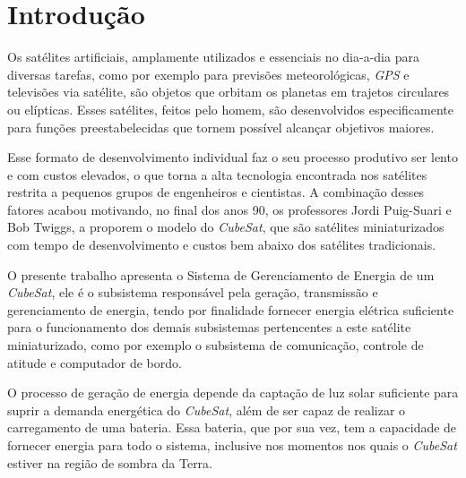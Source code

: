 \documentclass[
	12pt,				%
	openright,			%
	oneside,			%
	a4paper,			%
	english,			%
	french,				%
	spanish,			%
	brazil,				%
	oldfontcommands
	]{abntex2}
\begin{document}
\tableofcontents*
\cleardoublepage



\textual

\chapter[Introdução]{Introdução}

	Os satélites artificiais, amplamente utilizados e essenciais no dia-a-dia para diversas tarefas, como por exemplo para previsões meteorológicas, \textit{GPS} e televisões via satélite, são objetos que orbitam os planetas em trajetos circulares ou elípticas. Esses satélites, feitos pelo homem, são desenvolvidos especificamente para funções preestabelecidas que tornem possível alcançar objetivos maiores. 
	
	Esse formato de desenvolvimento individual faz o seu processo produtivo ser lento e com custos elevados, o que torna a alta tecnologia encontrada nos satélites restrita a pequenos grupos de engenheiros e cientistas. A combinação desses fatores acabou motivando, no final dos anos 90, os professores Jordi Puig-Suari e Bob Twiggs, a proporem o modelo do \textit{CubeSat}, que são satélites miniaturizados com tempo de desenvolvimento e custos bem abaixo dos satélites tradicionais.
	
	O presente trabalho apresenta o Sistema de Gerenciamento de Energia de um \textit{CubeSat}, ele é o subsistema responsável pela geração, transmissão e gerenciamento de energia, tendo por finalidade fornecer energia elétrica suficiente para o funcionamento dos demais subsistemas pertencentes a este satélite miniaturizado, como por exemplo o subsistema de comunicação, controle de atitude e computador de bordo.
	
	O processo de geração de energia depende da captação de luz solar suficiente para suprir a demanda energética do \textit{CubeSat}, além de ser capaz de realizar o carregamento de uma bateria. Essa bateria, que por sua vez, tem a capacidade de fornecer energia para todo o sistema, inclusive nos momentos nos quais o \textit{CubeSat} estiver na região de sombra da Terra.
	
\end{document}
